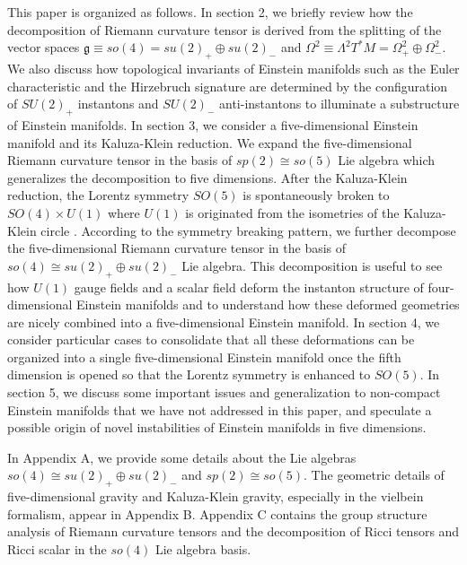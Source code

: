 \documentclass[12pt,epsf]{article}
\begin{document}
This paper is organized as follows. In section 2, we briefly review how the decomposition of
Riemann curvature tensor  is derived from the splitting of the vector spaces
$\mathfrak{g} \equiv so(4) = su(2)_+ \oplus su(2)_-$ and $\Omega^2 \equiv \Lambda^2 T^* M = \Omega^2_+ \oplus \Omega^2_-$.
We also discuss how topological invariants of Einstein manifolds such as
the Euler characteristic and the Hirzebruch signature are determined by the configuration
of $SU(2)_+$ instantons and $SU(2)_-$ anti-instantons to illuminate a substructure of Einstein manifolds.
In section 3, we consider a five-dimensional Einstein manifold and its Kaluza-Klein reduction.
We expand the five-dimensional Riemann curvature tensor in the basis of $sp(2) \cong so(5)$ Lie algebra
which generalizes the decomposition  to five dimensions.
After the Kaluza-Klein reduction, the Lorentz symmetry $SO(5)$ is spontaneously
broken to $SO(4) \times U(1)$ where $U(1)$ is originated from the isometries of the Kaluza-Klein circle \cite{kk-book}.
According to the symmetry breaking pattern, we further decompose the five-dimensional Riemann curvature tensor
in the basis of $so(4) \cong su(2)_+ \oplus su(2)_-$ Lie algebra.
This decomposition is useful to see how $U(1)$ gauge fields and a scalar field deform the instanton structure
of four-dimensional Einstein manifolds and to understand how these deformed geometries are nicely combined
into a five-dimensional Einstein manifold.
In section 4, we consider particular cases to consolidate that all these deformations can be organized
into a single five-dimensional Einstein manifold once the fifth dimension is opened so that
the Lorentz symmetry is enhanced to $SO(5)$.
In section 5, we discuss some important issues and generalization to non-compact Einstein manifolds
that we have not addressed in this paper, and speculate a possible origin
of novel instabilities of Einstein manifolds in five dimensions.





In Appendix A, we provide some details about the Lie algebras $so(4) \cong su(2)_+ \oplus su(2)_-$ and
$sp(2) \cong so(5)$. The geometric details of five-dimensional gravity and Kaluza-Klein gravity,
especially in the vielbein formalism, appear in Appendix B.
Appendix C contains the group structure analysis of Riemann curvature tensors and the decomposition of
Ricci tensors and Ricci scalar in the $so(4)$ Lie algebra basis.
\end{document}
